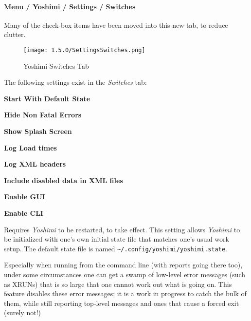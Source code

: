 \paragraph{Menu / Yoshimi / Settings / Switches}
\label{paragraph:menu_yoshimi_settings_switches}

   Many of the check-box items have been moved into this new tab, to reduce
   clutter.

\begin{figure}[H]
   \centering 
   \texttt{[image: 1.5.0/SettingsSwitches.png]}
   \caption{Yoshimi Switches Tab}
   \label{fig:yoshimi_settings_switches_tab}
\end{figure}

   The following settings exist in the \textsl{Switches} tab:

   \begin{enumber}
      \item \textbf{Start With Default State}
      \item \textbf{Hide Non Fatal Errors}
      \item \textbf{Show Splash Screen}
      \item \textbf{Log Load times}
      \item \textbf{Log XML headers}
      \item \textbf{Include disabled data in XML files}
      \item \textbf{Enable GUI}
      \item \textbf{Enable CLI}
   \end{enumber}

   \setcounter{ItemCounter}{0}      %

   Requires \textsl{Yoshimi} to be restarted, to take effect.
   This setting allows \textsl{Yoshimi} to be initialized with one's own
   initial state file that matches one's usual work setup.
   The default state file is named
   \texttt{\textasciitilde/.config/yoshimi/yoshimi.state}.

   Especially when running from the command line (with reports going there
   too), under some circumstances one can get a swamp of low-level error
   messages (such as XRUNs) that is so large that one cannot work out what is
   going on. This feature disables these error messages; it is a work in
   progress to catch the bulk of them, while still reporting top-level messages
   and ones that cause a forced exit (surely not!)

